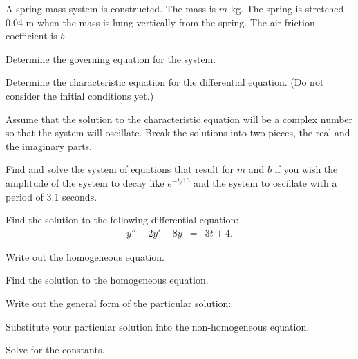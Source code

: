 \begin{problem}
\item A spring mass system is constructed. The mass is $m$ kg. The
  spring is stretched 0.04 m when the mass is hung vertically from the
  spring. The air friction coefficient is $b$.

    \begin{subproblem}
      \item Determine the governing equation for the system. 
        \vfill

      \item Determine the characteristic equation for the differential
        equation. (Do not consider the initial conditions yet.)
        \vfill

        \clearpage

      \item Assume that the solution to the characteristic equation
        will be a complex number so that the system will
        oscillate. Break the solutions into two pieces, the real and
        the imaginary parts.

        \vfill

      \item Find and solve the system of equations that result for $m$
        and $b$ if you wish the amplitude of the system to decay like
        $e^{-t/10}$ and the system to oscillate with a period of 3.1
        seconds.

        \vfill

    \end{subproblem}


\end{problem}



  \begin{problem}
  \item Find the solution to the following differential equation:
    \begin{eqnarray*}
      y'' - 2y' - 8y & = & 3t + 4.
    \end{eqnarray*}
    \begin{subproblem}
    \item Write out the homogeneous equation.
      \vspace{2em}
    \item Find the solution to the homogeneous equation.
      \vfill

    \clearpage

  \item Write out the general form of the particular solution:
    \vspace{2em}

  \item Substitute your particular solution into the non-homogeneous equation.
    \vfill

  \item Solve for the constants.
    \vfill

  \end{subproblem}

  \end{problem}

